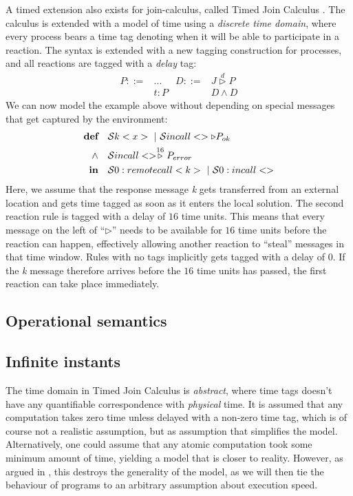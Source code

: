 A timed extension also exists for join-calculus, called Timed Join
Calculus \cite{timed-join}. The calculus is extended with a model of
time using a \emph{discrete time domain}, where every process bears a
time tag denoting when it will be able to participate in a reaction.
The syntax is extended with a new tagging construction for processes,
and all reactions are tagged with a
\emph{delay} tag:
\begin{align*}
  P ::={} & ...    & D ::={}& J \stackrel{d}{\triangleright} P \\
          & t : P  &        & D \land D
\end{align*}
We can now model the example above without depending on special
messages that get captured by the environment:
\begin{align*}
  \textbf{def}\quad & \S k<x> ~|~ \S incall<> \triangleright P_{ok} \\
  \land\quad & \S incall<> \stackrel{16}{\triangleright} P_{error} \\
  \textbf{in}\quad & \S 0:remotecall<k> ~|~ \S 0:incall<>
\end{align*}
Here, we assume that the response message \emph{k} gets transferred
from an external location and gets time tagged as soon as it enters
the local solution.  The second reaction rule is tagged with a delay
of $16$ time units.  This means that every message on the left of
``$\triangleright$'' needs to be available for $16$ time units before
the reaction can happen, effectively allowing another reaction to
``steal'' messages in that time window. Rules with no tags implicitly
gets tagged with a delay of $0$. If the \emph{k} message therefore
arrives before the $16$ time units has passed, the first reaction can
take place immediately.


\subsection{Operational semantics}



\subsection{Infinite instants}

The time domain in Timed Join Calculus is \emph{abstract}, where time
tags doesn't have any quantifiable correspondence with \emph{physical}
time. It is assumed that any computation takes zero time unless
delayed with a non-zero time tag, which is of course not a realistic
assumption, but as assumption that simplifies the model.
Alternatively, one could assume that any atomic computation took some
minimum amount of time, yielding a model that is closer to reality.
However, as argued in \cite{nicollin-overview}, this destroys the
generality of the model, as we will then tie the behaviour of programs
to an arbitrary assumption about execution speed.

